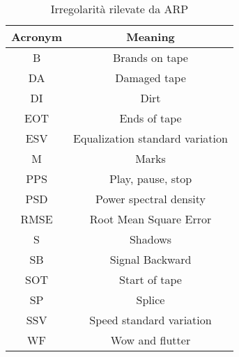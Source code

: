 \begin{table}[]
    \centering
    \begin{tabular}{|c|c|}
        \hline
        \textbf{Acronym} &      \textbf{Meaning}\\
        \hline
        B       &   Brands on tape\\
        DA      &   Damaged tape\\
        DI      &   Dirt\\
        EOT     &   Ends of tape\\
        ESV     &   Equalization standard variation\\
        M       &   Marks\\
        PPS     &   Play, pause, stop\\
        PSD     &   Power spectral density\\
        RMSE    &   Root Mean Square Error\\
        S       &   Shadows\\
        SB      &   Signal Backward\\
        SOT     &   Start of tape\\
        SP      &   Splice\\
        SSV     &   Speed standard variation\\
        WF      &   Wow and flutter\\
        \hline
    \end{tabular}
    \caption{Irregolarità rilevate da \ac{ARP}} \cite{ieeeStandard3302-2022}
    \label{tab:arp-irrs}
\end{table}
